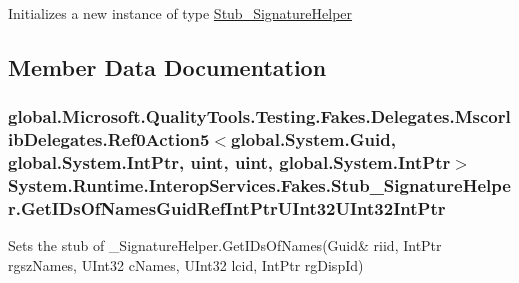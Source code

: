 Initializes a new instance of type \hyperlink{class_system_1_1_runtime_1_1_interop_services_1_1_fakes_1_1_stub___signature_helper}{Stub\-\_\-\-Signature\-Helper}



\subsection{Member Data Documentation}
\hypertarget{class_system_1_1_runtime_1_1_interop_services_1_1_fakes_1_1_stub___signature_helper_aef62e8947b38b174e5744bbd64e6b344}{
\subsubsection[{Get\-I\-Ds\-Of\-Names\-Guid\-Ref\-Int\-Ptr\-U\-Int32\-U\-Int32\-Int\-Ptr}]{\setlength{\rightskip}{0pt plus 5cm}global.\-Microsoft.\-Quality\-Tools.\-Testing.\-Fakes.\-Delegates.\-Mscorlib\-Delegates.\-Ref0\-Action5$<$global.\-System.\-Guid, global.\-System.\-Int\-Ptr, uint, uint, global.\-System.\-Int\-Ptr$>$ System.\-Runtime.\-Interop\-Services.\-Fakes.\-Stub\-\_\-\-Signature\-Helper.\-Get\-I\-Ds\-Of\-Names\-Guid\-Ref\-Int\-Ptr\-U\-Int32\-U\-Int32\-Int\-Ptr}}\label{class_system_1_1_runtime_1_1_interop_services_1_1_fakes_1_1_stub___signature_helper_aef62e8947b38b174e5744bbd64e6b344}


Sets the stub of \-\_\-\-Signature\-Helper.\-Get\-I\-Ds\-Of\-Names(Guid\& riid, Int\-Ptr rgsz\-Names, U\-Int32 c\-Names, U\-Int32 lcid, Int\-Ptr rg\-Disp\-Id)

